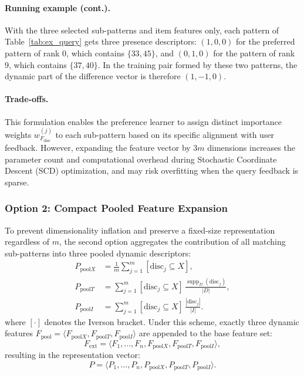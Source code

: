 \documentclass[sigconf]{acmart}
\newcommand{\supp}{\operatorname{supp}}
\newcommand{\disc}{\mathrm{disc}}
\newcommand{\pool}{\mathrm{pool}}
\begin{document}
\paragraph{Running example (cont.).}
With the three selected sub-patterns and item features only, each pattern of Table~\ref{tab:ex_query} gets three presence descriptors: $(1,0,0)$ for the preferred pattern of rank $0$, which contains $\{33,45\}$, and $(0,1,0)$ for the pattern of rank $9$, which contains $\{37,40\}$. In the training pair formed by these two patterns, the dynamic part of the difference vector is therefore $(1,-1,0)$.

\paragraph{Trade-offs.}
This formulation enables the preference learner to assign distinct importance weights $w_{F_{\disc}}^{(j)}$ to each sub-pattern based on its specific alignment with user feedback. However, expanding the feature vector by $3m$ dimensions increases the parameter count and computational overhead during Stochastic Coordinate Descent (SCD) optimization, and may risk overfitting when the query feedback is sparse.

\subsubsection{Option 2: Compact Pooled Feature Expansion}
To prevent dimensionality inflation and preserve a fixed-size representation regardless of $m$, the second option aggregates the contribution of all matching sub-patterns into three pooled dynamic descriptors:
\begin{align}
 P_{\pool X} &= \frac{1}{m}\sum_{j=1}^{m}[\disc_j\subseteq X], \label{eq:pooled-x}\\
 P_{\pool T} &= \sum_{j=1}^{m} [\disc_j\subseteq X]\,\frac{\supp_D(\disc_j)}{|D|}, \label{eq:pooled-t}\\
 P_{\pool I} &= \sum_{j=1}^{m} [\disc_j\subseteq X]\,\frac{|\disc_j|}{|I|}. \label{eq:pooled-i}
\end{align}
where $[\cdot]$ denotes the Iverson bracket. Under this scheme, exactly three dynamic features $F_{\pool}=\langle F_{\pool X},F_{\pool T},F_{\pool I}\rangle$ are appended to the base feature set:
\begin{equation}\label{eq:features-pool}
 F_{\mathrm{ext}}=\langle F_1,\ldots,F_n,F_{\pool X},F_{\pool T},F_{\pool I}\rangle,
\end{equation}
resulting in the representation vector:
\begin{equation}\label{eq:patterns-pool}
 P=\langle P_1,\ldots,P_n,P_{\pool X},P_{\pool T},P_{\pool I}\rangle.
\end{equation}
\end{document}
